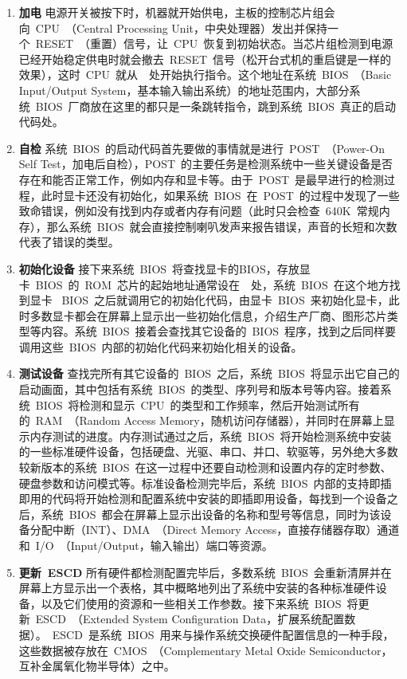 \begin{enumerate}
\item{\textbf{加电}} 电源开关被按下时，机器就开始供电，主板的控制芯片组会向~CPU~（Central Processing Unit，中央处理器）发出并保持一个~RESET~（重置）信号，让~CPU~恢复到初始状态。当芯片组检测到电源已经开始稳定供电时就会撤去~RESET~信号（松开台式机的重启键是一样的效果），这时~CPU~就从~~处开始执行指令。这个地址在系统~BIOS~（Basic Input/Output System，基本输入输出系统）的地址范围内，大部分系统~BIOS~厂商放在这里的都只是一条跳转指令，跳到系统~BIOS~真正的启动代码处。

\item{\textbf{自检}} 系统~BIOS~的启动代码首先要做的事情就是进行~POST~（Power-On Self Test，加电后自检），POST~的主要任务是检测系统中一些关键设备是否存在和能否正常工作，例如内存和显卡等。由于~POST~是最早进行的检测过程，此时显卡还没有初始化，如果系统~BIOS~在~POST~的过程中发现了一些致命错误，例如没有找到内存或者内存有问题（此时只会检查~640K~常规内存），那么系统~BIOS~就会直接控制喇叭发声来报告错误，声音的长短和次数代表了错误的类型。

\item{\textbf{初始化设备}} 接下来系统~BIOS~将查找显卡的BIOS，存放显卡~BIOS~的~ROM~芯片的起始地址通常设在~~处，系统~BIOS~在这个地方找到显卡 ~BIOS~之后就调用它的初始化代码，由显卡~BIOS~来初始化显卡，此时多数显卡都会在屏幕上显示出一些初始化信息，介绍生产厂商、图形芯片类型等内容。系统~BIOS~接着会查找其它设备的~BIOS~程序，找到之后同样要调用这些~BIOS~内部的初始化代码来初始化相关的设备。

\item{\textbf{测试设备}} 查找完所有其它设备的~BIOS~之后，系统~BIOS~将显示出它自己的启动画面，其中包括有系统~BIOS~的类型、序列号和版本号等内容。接着系统~BIOS~将检测和显示~CPU~的类型和工作频率，然后开始测试所有的~RAM~（Random Access Memory，随机访问存储器），并同时在屏幕上显示内存测试的进度。内存测试通过之后，系统~BIOS~将开始检测系统中安装的一些标准硬件设备，包括硬盘、光驱、串口、并口、软驱等，另外绝大多数较新版本的系统~BIOS~在这一过程中还要自动检测和设置内存的定时参数、硬盘参数和访问模式等。标准设备检测完毕后，系统~BIOS~内部的支持即插即用的代码将开始检测和配置系统中安装的即插即用设备，每找到一个设备之后，系统~BIOS~都会在屏幕上显示出设备的名称和型号等信息，同时为该设备分配中断（INT）、DMA~（Direct Memory Access，直接存储器存取）通道和~I/O~（Input/Output，输入输出）端口等资源。

\item{\textbf{更新~ESCD}} 所有硬件都检测配置完毕后，多数系统~BIOS~会重新清屏并在屏幕上方显示出一个表格，其中概略地列出了系统中安装的各种标准硬件设备，以及它们使用的资源和一些相关工作参数。接下来系统~BIOS~将更新~ESCD~（Extended System Configuration Data，扩展系统配置数据）。~ESCD~是系统~BIOS~用来与操作系统交换硬件配置信息的一种手段，这些数据被存放在~CMOS~（Complementary Metal Oxide Semiconductor，互补金属氧化物半导体）之中。


\end{enumerate}
